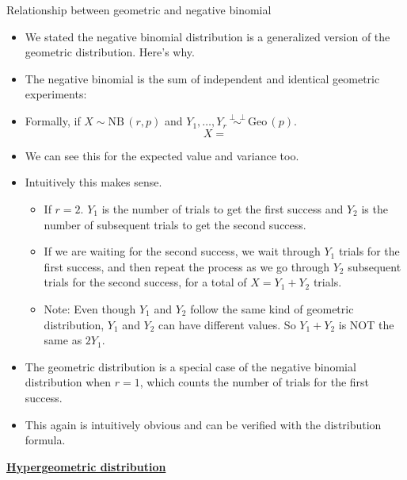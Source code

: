 \documentclass{article}
\newcommand{\bu}[1]{\textbf{\ul{#1}}}				%
\newcommand{\vectwo}[2]{#1_1, \ldots, #1_{#2}}	%
\newcommand{\follow}[1]{\sim \text{#1}\,}		%
\newcommand{\followsp}[2]{\overset{#1}\sim \text{#2}\,}		%
\newcommand{\ind}{\perp \!\!\! \perp}		%
\begin{document}
Relationship between geometric and negative binomial\bigskip
\begin{itemize}
    \item We stated the negative binomial distribution is a generalized version of the geometric distribution. Here's why.
    \item The negative binomial is the sum of independent and identical geometric experiments:
    \item[] Formally, if $X \follow{NB}(r, p)$ and $\vectwo{Y}{r} \followsp{\ind}{Geo}(p)$.
    \[X = \]
    \item We can see this for the expected value and variance too.\vspace{70pt}
    \item Intuitively this makes sense.
    \begin{itemize}
        \item If $r = 2$. $Y_1$ is the number of trials to get the first success and $Y_2$ is the number of subsequent trials to get the second success.
        \item If we are waiting for the second success, we wait through $Y_1$ trials for the first success, and then repeat the process as we go through $Y_2$ subsequent trials for the second success, for a total of $X = Y_1 + Y_2$ trials.\vspace{100pt}
        \item Note: Even though $Y_1$ and $Y_2$ follow the same kind of geometric distribution, $Y_1$ and $Y_2$ can have different values. So $Y_1 + Y_2$ is NOT the same as $2 Y_1$.
    \end{itemize}\bigskip
    \item The geometric distribution is a special case of the negative binomial distribution when $r = 1$, which counts the number of trials for the first success.
    \item[] This again is intuitively obvious and can be verified with the distribution formula. 
\end{itemize}\bigskip

\newpage%

\bu{Hypergeometric distribution}\bigskip
\end{document}
